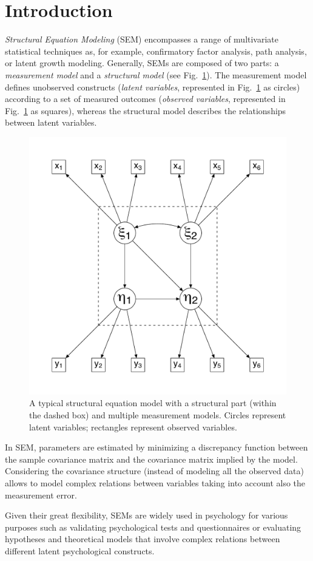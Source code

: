 \documentclass[graybox]{svmult}
\begin{document}
\section{Introduction}
\label{sec:1}

\emph{Structural Equation Modeling} (SEM) encompasses  a range of multivariate statistical techniques as, for example, confirmatory factor analysis, path analysis, or latent growth modeling. Generally, SEMs are composed of two parts: a \emph{measurement model} and a \emph{structural model} (see Fig.~\ref{fig:example_sem}).   The measurement model defines unobserved constructs (\emph{latent variables}, represented in Fig.~\ref{fig:example_sem} as circles) according to a set of measured outcomes (\emph{observed variables}, represented in Fig.~\ref{fig:example_sem} as squares), whereas the structural model describes the relationships between latent variables.

\begin{figure}[t]
	\sidecaption
	\label{fig:example_sem}
	\includegraphics[width = .50\textwidth]{figure/figure1}
	\caption{A typical structural equation model with a structural part (within the dashed box) and multiple measurement models. Circles represent latent variables; rectangles represent observed variables.}
\end{figure}

In SEM, parameters are estimated by minimizing a discrepancy function between the sample covariance matrix and the covariance matrix implied by the model. Considering the covariance structure (instead of modeling all the observed data) allows to model complex relations between variables taking into account also the  measurement error.

Given their great flexibility, SEMs are widely used in psychology for various purposes such as validating psychological tests and questionnaires or evaluating hypotheses and theoretical models that involve complex relations between different latent psychological constructs.
\end{document}
